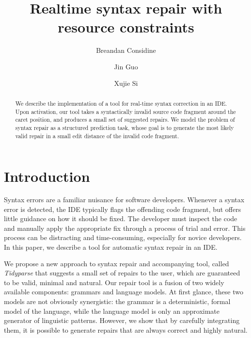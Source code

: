 \documentclass[runningheads]{llncs}
\begin{document}
%
\title{Realtime syntax repair with resource constraints}
%
%
\author{Breandan Considine \and
Jin Guo\and
Xujie Si}
%
%
%
\maketitle              %
%
\begin{abstract}
  We describe the implementation of a tool for real-time syntax correction in an IDE. Upon activation, our tool takes a syntactically invalid source code fragment around the caret position, and produces a small set of suggested repairs. We model the problem of syntax repair as a structured prediction task, whose goal is to generate the most likely valid repair in a small edit distance of the invalid code fragment.
\end{abstract}

\section{Introduction}

Syntax errors are a familiar nuisance for software developers. Whenever a syntax error is detected, the IDE typically flags the offending code fragment, but offers little guidance on how it should be fixed. The developer must inspect the code and manually apply the appropriate fix through a process of trial and error. This process can be distracting and time-consuming, especially for novice developers. In this paper, we describe a tool for automatic syntax repair in an IDE.

We propose a new approach to syntax repair and accompanying tool, called \textit{Tidyparse} that suggests a small set of repairs to the user, which are guaranteed to be valid, minimal and natural. Our repair tool is a fusion of two widely available components: grammars and language models. At first glance, these two models are not obviously synergistic: the grammar is a deterministic, formal model of the language, while the language model is only an approximate generator of linguistic patterns. However, we show that by carefully integrating them, it is possible to generate repairs that are always correct and highly natural.
\end{document}
